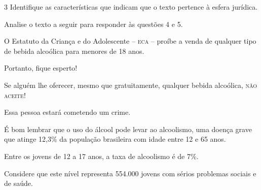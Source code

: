\pagebreak
\num{3} Identifique as características que indicam que o texto pertence à 
esfera jurídica.




Analise o texto a seguir para responder às questões 4 e 5. 


\begin{myquote}

O Estatuto da Criança e do Adolescente -- \textsc{eca} -- proíbe a venda de
qualquer tipo de bebida alcoólica para menores de 18 anos.

Portanto, fique esperto!

Se alguém lhe oferecer, mesmo que gratuitamente, qualquer bebida
alcoólica, \textsc{não aceite}!

Essa pessoa estará cometendo um crime.

É bom lembrar que o uso do álcool pode levar ao alcoolismo, uma doença
grave que atinge 12,3\% da população brasileira com idade entre 12 e 65
anos.

Entre os jovens de 12 a 17 anos, a taxa de alcoolismo é de 7\%.

Considere que este nível representa 554.000 jovens com sérios problemas
sociais e de saúde.


\end{myquote}

